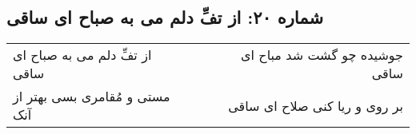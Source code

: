 \begin{center}
\section*{شماره ۲۰: از تفِّ دلم می به صباح ای ساقی}
\label{sec:020}
\begin{longtable}{l p{0.5cm} r}
از تفِّ دلم می به صباح ای ساقی
&&
جوشیده چو گشت شد مباح ای ساقی
\\
مستی و مُقامری بسی بهتر از آنک
&&
بر روی و ریا کنی صلاح ای ساقی
\\
\end{longtable}
\end{center}
